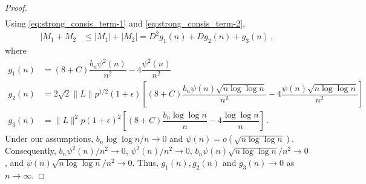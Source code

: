 \documentclass[11pt]{article}
\newtheorem{lemma}{Lemma}
\theoremstyle{remark}
\begin{document}
\begin{proof}
\begin{align*}
\end{align*}
%
%
%
%
Using \eqref{eq:strong_consis_term-1} and \eqref{eq:strong_consis_term-2},
\begin{align*}
|M_1 + M_2  & \leq |M_1| + |M_2|
   = D^2g_1(n) + D g_2(n) + g_3(n)\,,
\end{align*}
where
\begin{align*}
    g_1(n) &= (8 + C)\dfrac{b_n \psi^2(n)}{n^2} - 4\dfrac{\psi^2(n)}{n^2}\\
    g_2(n) &= 2\sqrt{2}\|L\|p^{1/2}(1+\epsilon)\left[(8 + C)\dfrac{b_n\psi(n)\sqrt{n\log \log n}}{n^2} - 4\dfrac{\psi(n)\sqrt{n\log \log n}}{n^2}\right]\\
    g_3(n) &= \|L\|^2 p (1+\epsilon)^2\left[(8 + C)\dfrac{b_n \log\log n}{n} - 4 \dfrac{\log \log n}{n}\right]\,.
\end{align*}
Under our assumptions, 
$b_n\log \log n /n \to 0$ and $\psi(n) = o(\sqrt{n \log \log n})$. Consequently, 
$b_n \psi^2(n)/n^2 \to 0$, $\psi^2(n)/n^2 \to 0$, ${b_n\psi(n)\sqrt{n\log \log n}/n^2} \to 0$, and $\psi(n) \sqrt{n \log \log n}/n^2 \to 0$. Thus, $g_1(n), g_2(n)$ and $g_3(n) \to 0$ as $n \to \infty$. 

\end{proof}
\end{document}
